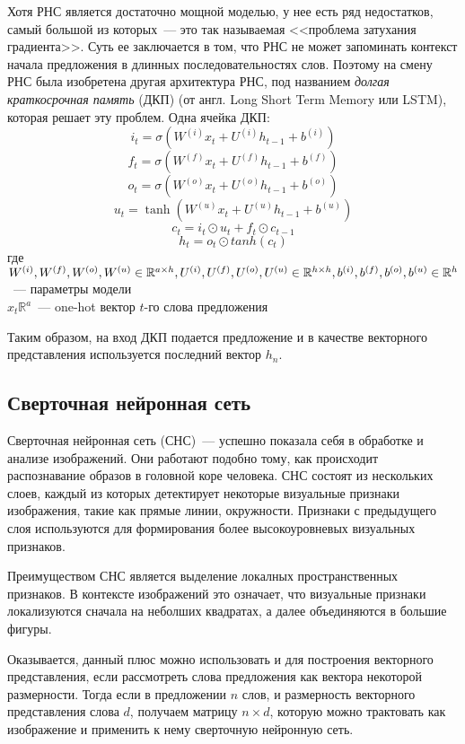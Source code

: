 Хотя РНС является достаточно мощной моделью, у нее есть ряд недостатков, самый большой из которых~--- это так называемая <<проблема затухания градиента>>. Суть ее заключается в том, что РНС не может запоминать контекст начала предложения в длинных последовательностях слов. Поэтому на смену РНС была изобретена другая архитектура РНС, под названием \emph{долгая краткосрочная память} (ДКП) (от англ. Long Short Term Memory или LSTM), которая решает эту проблем\cite{Hochreiter:1997:LSM:265493.264179}. Одна ячейка ДКП:
$$i_t=\sigma \left( W^{(i)}x_t+U^{(i)}h_{t-1} + b^{(i)} \right)$$
$$f_t=\sigma \left( W^{(f)}x_t+U^{(f)}h_{t-1} + b^{(f)} \right)$$
$$o_t=\sigma \left( W^{(o)}x_t+U^{(o)}h_{t-1} + b^{(o)} \right)$$
$$u_t=\tanh \left( W^{(u)}x_t+U^{(u)}h_{t-1} + b^{(u)} \right)$$
$$c_t=i_t \odot u_t + f_t \odot c_{t-1}$$
$$h_t=o_t \odot tanh(c_t)$$
где $W^{(i)}, W^{(f)}, W^{(o)}, W^{(u)} \in \mathbb{R}^{a \times h},\\U^{(i)}, U^{(f)}, U^{(o)}, U^{(u)} \in \mathbb{R}^{h \times h},\\b^{(i)}, b^{(f)}, b^{(o)}, b^{(u)} \in \mathbb{R}^{h}$~--- параметры модели\\
$x_t \mathbb{R}^a$~--- one-hot вектор $t$-го слова предложения

Таким образом, на вход ДКП подается предложение и в качестве векторного представления используется
последний вектор $h_n$.

\subsection{Сверточная нейронная сеть}
Сверточная нейронная сеть (СНС)~--- успешно показала себя в обработке и анализе изображений. Они работают подобно тому, как происходит распознавание образов в головной коре человека. СНС состоят из нескольких слоев, каждый из которых детектирует некоторые визуальные признаки изображения, такие как прямые линии, окружности. Признаки с предыдущего слоя используются для формирования более высокоуровневых визуальных признаков.

Преимуществом СНС является выделение локалных пространственных признаков. В контексте изображений это означает, что визуальные признаки локализуются сначала на неболших квадратах, а далее объединяются в большие фигуры.

Оказывается, данный плюс можно использовать и для построения векторного представления, 
если рассмотреть слова предложения как вектора некоторой размерности. Тогда если в предложении $n$ слов, 
и размерность векторного представления слова $d$, получаем матрицу $n \times d$, 
которую можно трактовать как изображение и применить к нему сверточную нейронную сеть\cite{Lecun98gradient-basedlearning, DBLP:journals/corr/Kim14f}.

